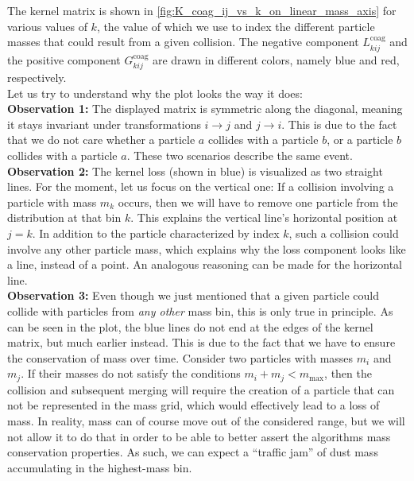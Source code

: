         The kernel matrix is shown in \cref{fig:K_coag_ij_vs_k_on_linear_mass_axis} for 
        various values of $k$, the value of which we use to index the different particle 
        masses that could result from a given collision.
        The negative component $L^\text{coag}_{kij}$ and the positive component 
        $G^\text{coag}_{kij}$ are drawn in different colors, namely blue and red, respectively. \\

        Let us try to understand why the plot looks the way it does: \\

        \textbf{Observation 1:} The displayed matrix is symmetric along the diagonal, meaning 
        it stays invariant under transformations $i \to j$ and $j \to i$. This is due to the 
        fact that we do not care whether a particle $a$ collides with a particle $b$, or a 
        particle $b$ collides with a particle $a$. These two scenarios describe the same
        event. \\

        \textbf{Observation 2:} The kernel loss (shown in blue) is visualized as two 
        straight lines. For the moment, let us focus on the vertical one: If a collision involving 
        a particle with mass $m_k$ occurs, then we will have to remove one particle from the 
        distribution at that bin $k$. This explains the vertical line's horizontal position at 
        $j = k$. In addition to the particle characterized by index $k$, such a collision could 
        involve any other particle mass, which explains why the loss component looks like a line, 
        instead of a point. An analogous reasoning can be made for the horizontal line. \\

        \textbf{Observation 3:} Even though we just mentioned that a given particle could 
        collide with particles from \textit{any other} mass bin, this is only true in principle. 
        As can be seen in the plot, the blue lines do not end at the edges of the kernel matrix, 
        but much earlier instead. This is due to the fact that we have to ensure the conservation 
        of mass over time. Consider two particles with masses $m_i$ and $m_j$. If their masses 
        do not satisfy the conditions $m_i + m_j < m_\text{max}$, then the collision and subsequent 
        merging will require the creation of a particle that can not be represented in the mass 
        grid, which would effectively lead to a loss of mass. 
        In reality, mass can of course move out of the considered range, but we will not allow it 
        to do that in order to be able to better assert the algorithms mass conservation properties.
        As such, we can expect a ``traffic jam'' of dust mass accumulating in the highest-mass bin.
        \\

